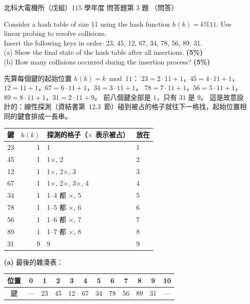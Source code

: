 \begin{pastexam}[label={px:ntut-115-ee-ds-23}]{北科大電機所（戊組）115 學年度 問答題第 3 題}
（問答）

Consider a hash table of size 11 using the hash function $h(k) = k\%11$. Use linear probing to resolve
collisions.\\
Insert the following keys in order: 23, 45, 12, 67, 34, 78, 56, 89, 31.\\
(a) Show the final state of the hash table after all insertions. \textbf{(5\%)}\\
(b) How many collisions occurred during the insertion process? \textbf{(5\%)}
\end{pastexam}

\begin{pastsoln}
先算每個鍵的起始位置 $h(k) = k \bmod 11$：
$23 = 2 \cdot 11 + 1$，$45 = 4 \cdot 11 + 1$，$12 = 11 + 1$，$67 = 6 \cdot 11 + 1$，$34 = 3 \cdot 11 + 1$，
$78 = 7 \cdot 11 + 1$，$56 = 5 \cdot 11 + 1$，$89 = 8 \cdot 11 + 1$，$31 = 2 \cdot 11 + 9$。 前八個鍵全部是 $1$，只有 $31$ 是 $9$。
這是故意設計的：線性探測（資結書第~12.3~節）碰到被占的格子就往下一格找，起始位置相同的鍵會排成一長串。
\begin{center}
\small
\begin{tabular}{crll}
\toprule
鍵 & $h(k)$ & 探測的格子（$\times$ 表示被占） & 放在 \\
\midrule
23 & 1 & 1 & 1 \\
45 & 1 & 1$\times$, 2 & 2 \\
12 & 1 & 1$\times$, 2$\times$, 3 & 3 \\
67 & 1 & 1$\times$, 2$\times$, 3$\times$, 4 & 4 \\
34 & 1 & 1--4 都 $\times$, 5 & 5 \\
78 & 1 & 1--5 都 $\times$, 6 & 6 \\
56 & 1 & 1--6 都 $\times$, 7 & 7 \\
89 & 1 & 1--7 都 $\times$, 8 & 8 \\
31 & 9 & 9 & 9 \\
\bottomrule
\end{tabular}
\end{center}

\textbf{(a)} 最後的雜湊表：
\begin{center}
\begin{tabular}{c|ccccccccccc}
位置 & 0 & 1 & 2 & 3 & 4 & 5 & 6 & 7 & 8 & 9 & 10 \\
\hline
鍵 & — & 23 & 45 & 12 & 67 & 34 & 78 & 56 & 89 & 31 & — \\
\end{tabular}
\end{center}


\end{pastsoln}
